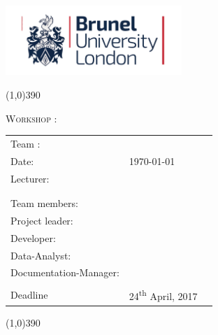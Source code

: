 \begin{titlepage}
	\flushright
	\includegraphics[width=0.50\textwidth]{res/Brunel_University_Logo.png}\par
	\centering
	\line(1,0){390}\\
	\vfill
	\raggedright
	{\scshape Workshop \courseNumber: \par}
	{\Huge\bfseries \courseName\par}
	{\Large\bfseries \assignmentName\par}
	\vspace{1.5cm}
	
	\begin{tabular}{lll}
	Team \teamNo: & \multicolumn{2}{l}{\teamName} \\
	Date:	& \multicolumn{2}{l}{\today} \\
	Lecturer: & \multicolumn{2}{l}{\prof} \\
	& & \\
	& & \\
	Team members: & & \\
	\hline
	Project leader: & \studentNumberOne & \assignmentAuthorOne \\
	Developer: & \studentNumberThree & \assignmentAuthorThree \\
	Data-Analyst: & \studentNumberTwo & \assignmentAuthorTwo \\
	Documentation-Manager: & \studentNumberFour & \assignmentAuthorFour \\
	& & \\
	Deadline & 24\textsuperscript{th} April, 2017
	\end{tabular}
		
	\vfill
	\line(1,0){390}
	\flushleft
\end{titlepage}